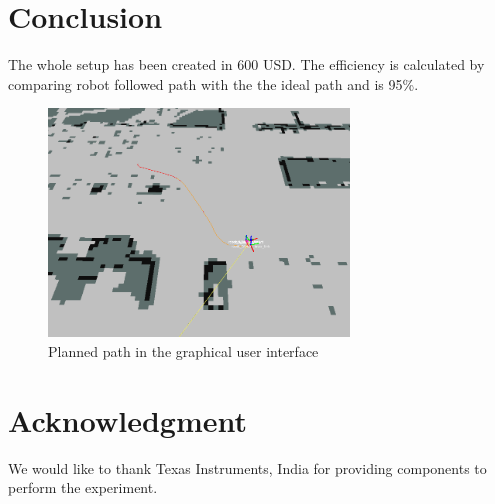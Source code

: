 \documentclass[conference]{IEEEtran}
\begin{document}
\section{Conclusion}
The whole setup has been created in 600 USD. The efficiency is calculated by comparing  robot followed path with the the ideal path and is 95\%. 
\begin{figure}[h]
\includegraphics[width=8cm]{rviz.png}
\centering
\caption{Planned path in the graphical user interface}\label{net_img}
\end{figure}
\section*{Acknowledgment}
We would like to thank Texas Instruments, India for providing components to perform the experiment.
\end{document}
